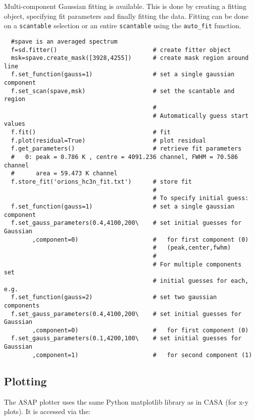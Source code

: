 Multi-component Gaussian fitting is available. This is done by
creating a fitting object, specifying fit parameters and finally
fitting the data. Fitting can be done on a {\tt scantable} selection
or an entire {\tt scantable} using the {\tt auto\_fit} function.

\small
\begin{verbatim}
  #spave is an averaged spectrum
  f=sd.fitter()                           # create fitter object
  msk=spave.create_mask([3928,4255])      # create mask region around line
  f.set_function(gauss=1)                 # set a single gaussian component
  f.set_scan(spave,msk)                   # set the scantable and region
                                          # 
                                          # Automatically guess start values
  f.fit()                                 # fit 
  f.plot(residual=True)                   # plot residual
  f.get_parameters()                      # retrieve fit parameters
  #   0: peak = 0.786 K , centre = 4091.236 channel, FWHM = 70.586 channel
  #      area = 59.473 K channel
  f.store_fit('orions_hc3n_fit.txt')      # store fit
                                          #
                                          # To specify initial guess:
  f.set_function(gauss=1)                 # set a single gaussian component
  f.set_gauss_parameters(0.4,4100,200\    # set initial guesses for Gaussian
        ,component=0)                     #   for first component (0)
                                          #   (peak,center,fwhm)
                                          #
                                          # For multiple components set
                                          # initial guesses for each, e.g.
  f.set_function(gauss=2)                 # set two gaussian components
  f.set_gauss_parameters(0.4,4100,200\    # set initial guesses for Gaussian
        ,component=0)                     #   for first component (0)
  f.set_gauss_parameters(0.1,4200,100\    # set initial guesses for Gaussian
        ,component=1)                     #   for second component (1)

\end{verbatim}
\normalsize

\subsection{Plotting}
\label{subsection:sd.asap.plotting}

The ASAP plotter uses the same Python matplotlib library as in CASA
(for x-y plots). It is accessed via the: 

